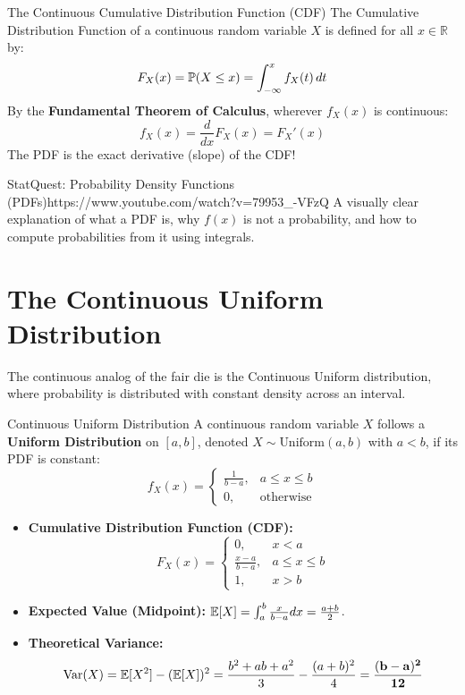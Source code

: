 \begin{theorembox}{The Continuous Cumulative Distribution Function (CDF)}
The Cumulative Distribution Function of a continuous random variable $X$ is defined for all $x \in \mathbb{R}$ by:
$$F_X(x) = \P(X \le x) = \int_{-\infty}^x f_X(t) \, dt$$
By the \textbf{Fundamental Theorem of Calculus}, wherever $f_X(x)$ is continuous:
$$f_X(x) = \frac{d}{dx} F_X(x) = F_X'(x)$$
The PDF is the exact derivative (slope) of the CDF!
\end{theorembox}

\begin{videocard}{StatQuest: Probability Density Functions (PDFs)}{https://www.youtube.com/watch?v=79953_-VFzQ}
A visually clear explanation of what a PDF is, why $f(x)$ is not a probability, and how to compute probabilities from it using integrals.
\end{videocard}

\section{The Continuous Uniform Distribution}

The continuous analog of the fair die is the Continuous Uniform distribution, where probability is distributed with constant density across an interval.

\begin{definitionbox}{Continuous Uniform Distribution}
A continuous random variable $X$ follows a \textbf{Uniform Distribution} on $[a, b]$, denoted $X \sim \text{Uniform}(a, b)$ with $a < b$, if its PDF is constant:
$$f_X(x) = \begin{cases}
\frac{1}{b - a}, & a \le x \le b \\[4pt]
0, & \text{otherwise}
\end{cases}$$
\begin{itemize}
    \item \textbf{Cumulative Distribution Function (CDF):}
    $$F_X(x) = \begin{cases}
    0, & x < a \\[4pt]
    \frac{x - a}{b - a}, & a \le x \le b \\[4pt]
    1, & x > b
    \end{cases}$$
    \item \textbf{Expected Value (Midpoint):} $\E[X] = \int_a^b \frac{x}{b-a} dx = \frac{a + b}{2}$.
    \item \textbf{Theoretical Variance:}
    $$\Var(X) = \E[X^2] - (\E[X])^2 = \frac{b^2 + ab + a^2}{3} - \frac{(a + b)^2}{4} = \mathbf{\frac{(b - a)^2}{12}}$$
\end{itemize}
\end{definitionbox}

